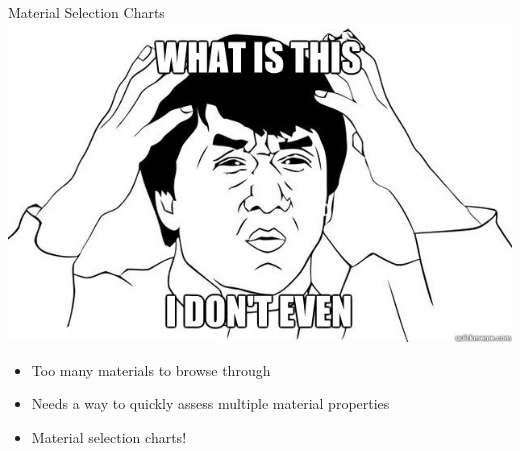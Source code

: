 \documentclass[10pt, svgnames]{beamer}
\begin{document}
\begin{frame}[label={sec:org9e73606}]{Material Selection Charts}
\centering
\includegraphics[height=0.5\textheight]{pictures/wtf}

\begin{itemize}
\item Too many materials to browse through
\item Needs a way to quickly assess multiple material properties
\item Material selection charts!
\end{itemize}
\end{frame}
\end{document}
